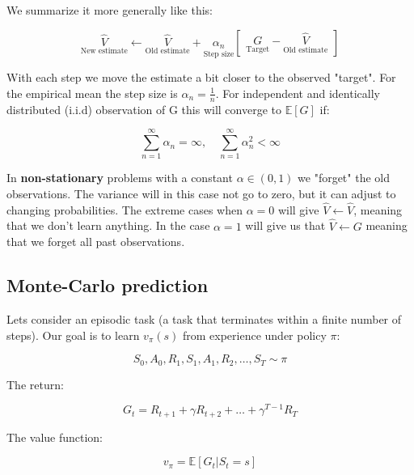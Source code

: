 We summarize it more generally like this:

	\begin{equation}
		\underset{\text{New estimate}}{\hat{V}} \leftarrow \underset{\text{Old estimate}}{\hat{V}}  +\underset{\text{Step size}}{\alpha_n} \begin{bmatrix} \underset{\text{Target}}{G} - \underset{\text{Old estimate}}{\hat{V}} \end{bmatrix} 
	\end{equation}

With each step we move the estimate a bit closer to the observed "target". For the empirical mean the step size is $\alpha_n = \frac{1} {n} $. For independent and identically distributed (i.i.d) observation of G this will converge to $\mathbb{E}[G]$ if:

	\begin{equation}
		\sum_{n=1}^{\infty} \alpha_n = \infty, \quad \sum_{n=1}^{\infty} \alpha_n^{2} < \infty
	\end{equation}


In \textbf{non-stationary} problems with a constant $\alpha \in (0,1)$ we "forget" the old observations. The variance will in this case not go to zero, but it can adjust to changing probabilities. The extreme cases when $\alpha = 0$ will give $\hat{V} \leftarrow \hat{V}$, meaning that we don't learn anything. In the case $\alpha = 1$ will give us that $\hat{V} \leftarrow G$ meaning that we forget all past observations. 

\subsection*{Monte-Carlo prediction}
Lets consider an episodic task (a task that terminates within a finite number of steps). Our goal is to learn $v_\pi(s)$ from experience under policy $\pi$:
	
	\begin{equation}
		S_0, A_0, R_1, S_1, A_1, R_2, \ldots, S_T \sim \pi
	\end{equation}

The return: 

	\begin{equation}
		G_t = R_{t+1} + \gamma R_{t+2} + \ldots + \gamma^{T-1}R_T
	\end{equation}

The value function:

	\begin{equation}
		v_\pi = \mathbb{E}[G_t |S_t = s]
	\end{equation}

